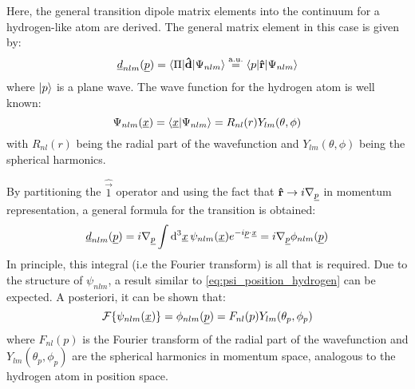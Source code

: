 
\label{sec:dipolematrixelements}


Here, the general transition dipole matrix elements into the continuum for a hydrogen-like atom are derived.     %
The general matrix element in this case is given by:
\begin{equation*}
    \underline{d}_{nlm}(\underline{p}) = \braket{\Pi|\mathbf{\hat{d}}|\Psi_{nlm}} \stackrel{\mathrm{a.u.}}{=} \braket{p|\mathbf{\hat{r}}|\Psi_{nlm}}
\end{equation*}
where $\ket{p}$ is a plane wave.
The wave function for the hydrogen atom is well known:
\begin{equation}
    \Psi_{nlm}(\underline{x}) = \braket{\underline{x}|\Psi_{nlm}} = R_{nl}(r)Y_{lm}(\theta, \phi) \label{eq:psi_position_hydrogen}
\end{equation}
with $R_{nl}(r)$ being the radial part of the wavefunction and $Y_{lm}(\theta, \phi)$ being the spherical harmonics.

By partitioning the $\hat{\vec{1}}$ operator and using the fact that $\mathbf{\hat{r}} \rightarrow i\nabla_{\underline{p}}$ %
in momentum representation, a general formula for the transition is obtained:
\begin{equation*}
    \underline{d}_{nlm}(\underline{p}) = i\nabla_{\underline{p}}\int \mathrm{d}^3\underline{x}\,\psi_{nlm}(\underline{x}) e^{-i\underline{p}\cdot\underline{x}} = i\nabla_{\underline{p}}\phi_{nlm}(\underline{p})
\end{equation*}
In principle, this integral (i.e the Fourier transform) is all that is required.
Due to the structure of $\psi_{nlm}$, a result similar to \eqref{eq:psi_position_hydrogen} can be expected.
A posteriori, it can be shown that:
\begin{equation*}
    \mathcal{F}\{\psi_{nlm}(\underline{x})\} = \phi_{nlm}(\underline{p}) = F_{nl}(p)Y_{lm}(\theta_p, \phi_p)
\end{equation*}
where $F_{nl}(p)$ is the Fourier transform of the radial part of the wavefunction and $Y_{lm}(\theta_p, \phi_p)$ are the spherical harmonics in momentum space, analogous to the hydrogen atom in position space.






